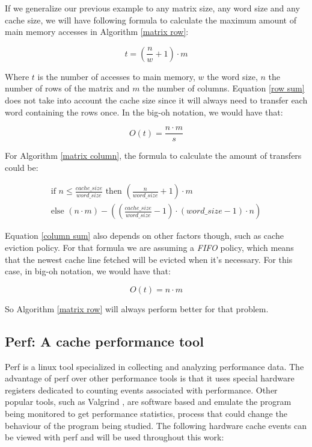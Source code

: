 \documentclass[12pt]{diicc}
\begin{document}
If we generalize our previous example to any matrix size, any word size and any cache size, we will have following formula to calculate the maximum amount of main memory accesses in Algorithm \ref{matrix row}:

\begin{equation}\label{row sum}
t=\left (\frac{n}{w} + 1 \right) \cdot m
\end{equation}

Where $t$ is the number of accesses to main memory, $w$ the word size, $n$ the number of rows of the matrix and $m$ the number of columns. Equation \eqref{row sum} does not take into account the cache size since it will always need to transfer each word containing the rows once. In the big-oh notation, we would have that:

\[ O(t)=\frac{n \cdot m}{s} \]

For Algorithm \ref{matrix column}, the formula to calculate the amount of transfers could be:

\begin{equation}\label{column sum}
\begin{split}
\mbox{if  }n\leq \frac{cache\_size}{word\_size} \mbox{  then  } \left (\frac{n}{word\_size} + 1 \right) \cdot m \\
\mbox{else  }(n \cdot m) - \left(\left(\frac{cache\_size}{word\_size}-1\right)\cdot \left(word\_size-1\right)\cdot n\right)
\end{split}
\end{equation}

Equation \eqref{column sum} also depends on other factors though, such as cache eviction policy. For that formula we are assuming a \textit{FIFO} policy, which means that the newest cache line fetched will be evicted when it's necessary. For this case, in big-oh notation, we would have that:

\[ O(t)=n \cdot m \]

So Algorithm \ref{matrix row} will always perform better for that problem.

\subsection{Perf: A cache performance tool}

Perf \cite{perf} is a linux tool specialized in collecting and analyzing performance data. The advantage of perf over other performance tools is that it uses special hardware registers dedicated to counting events associated with performance. Other popular tools, such as Valgrind \cite{valgrind}, are software based and emulate the program being monitored to get performance statistics, process that could change the behaviour of the program being studied. The following hardware cache events can be viewed with perf and will be used throughout this work:
\end{document}
